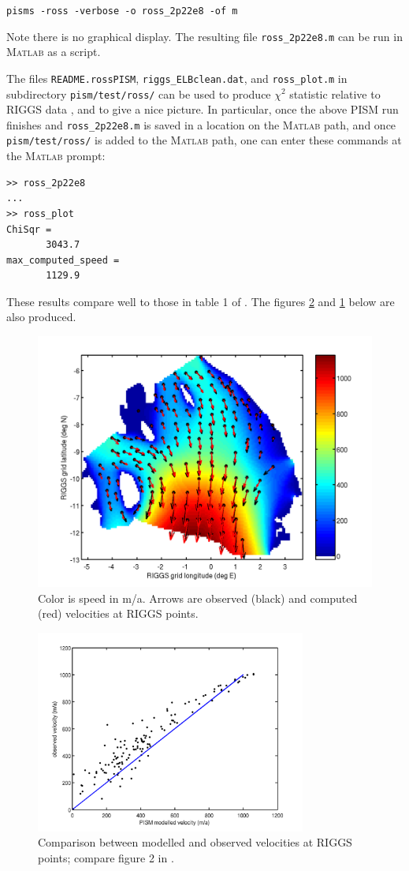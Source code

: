 \documentclass[11pt,final]{amsart}
\newcommand{\Matlab}{\textsc{Matlab}\xspace}
\begin{document}
\verb|pisms -ross -verbose -o ross_2p22e8 -of m|

\noindent Note there is no graphical display.  The resulting file \verb|ross_2p22e8.m| can be run in \Matlab as a script.

The files \verb|README.rossPISM|, \verb|riggs_ELBclean.dat|, and \verb|ross_plot.m| in subdirectory \verb|pism/test/ross/| can be used to produce $\chi^2$ statistic relative to RIGGS data \cite{MacAyealetal}, and to give a nice picture.  In particular, once the above PISM run finishes and \verb|ross_2p22e8.m| is saved in a location on the \Matlab path, and once \verb|pism/test/ross/| is added to the \Matlab path, one can enter these commands at the \Matlab prompt:
\small\begin{verbatim}
>> ross_2p22e8
...
>> ross_plot
ChiSqr =
       3043.7
max_computed_speed =
       1129.9
\end{verbatim}
\normalsize
These results compare well to those in table 1 of \cite{MacAyealetal}.  The figures \ref{fig:rossscatter} and \ref{fig:rossvelocities} below are also produced.

\begin{figure}[ht]
\includegraphics[width=4.5in,keepaspectratio=true]{figs/rossvelocities}
\caption{Color is speed in m/a.  Arrows are observed (black) and computed (red) velocities at RIGGS points.}
\label{fig:rossvelocities}
\end{figure}

\begin{figure}[ht]
\includegraphics[width=3.5in,keepaspectratio=true]{figs/rossscatter}
\caption{Comparison between modelled and observed velocities at RIGGS points; compare figure 2  in \cite{MacAyealetal}.}
\label{fig:rossscatter}
\end{figure}
\end{document}
